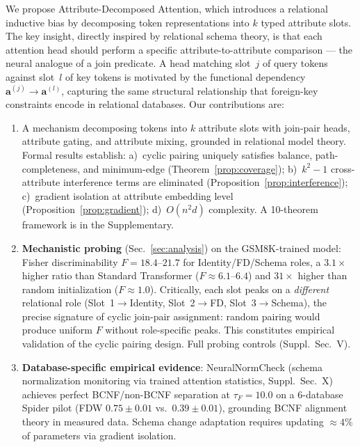 \documentclass[conference]{IEEEtran}
\begin{document}
We propose {Attribute-Decomposed Attention}, which introduces a relational inductive bias by decomposing token representations into $k$ typed attribute slots. The key insight, directly inspired by relational schema theory, is that each attention head should perform a specific attribute-to-attribute comparison --- the neural analogue of a join predicate. A head matching slot~$j$ of query tokens against slot~$l$ of key tokens is motivated by the functional dependency $\mathbf{a}^{(j)} \to \mathbf{a}^{(l)}$, capturing the same structural relationship that foreign-key constraints encode in relational databases.
Our contributions are:
\begin{enumerate}[noitemsep,topsep=2pt]
  \item A mechanism decomposing tokens into $k$ attribute slots with join-pair heads, attribute gating, and attribute mixing, grounded in relational model theory. Formal results establish: a)~cyclic pairing uniquely satisfies balance, path-completeness, and minimum-edge (Theorem~\ref{prop:coverage}); b)~$k^2{-}1$ cross-attribute interference terms are eliminated (Proposition~\ref{prop:interference}); c)~gradient isolation at attribute embedding level (Proposition~\ref{prop:gradient}); d)~$O(n^2d)$ complexity. A 10-theorem framework is in the Supplementary.

  \item \textbf{Mechanistic probing} (Sec.~\ref{sec:analysis}) on the GSM8K-trained model: Fisher discriminability $F{=}18.4$--$21.7$ for Identity/FD/Schema roles, a $3.1\times$ higher ratio than Standard Transformer ($F{\approx}6.1$--$6.4$) and $31\times$ higher than random initialization ($F{\approx}1.0$). Critically, each slot peaks on a \emph{different} relational role (Slot~1$\to$Identity, Slot~2$\to$FD, Slot~3$\to$Schema), the precise signature of cyclic join-pair assignment: random pairing would produce uniform $F$ without role-specific peaks. This constitutes empirical validation of the cyclic pairing design. Full probing controls (Suppl.\ Sec.~V).

  \item \textbf{Database-specific empirical evidence}: NeuralNormCheck (schema normalization monitoring via trained attention statistics, Suppl.\ Sec.~X) achieves perfect BCNF/non-BCNF separation at $\tau_F{=}10.0$ on a 6-database Spider pilot (FDW $0.75{\pm}0.01$ vs.\ $0.39{\pm}0.01$), grounding BCNF alignment theory in measured data. Schema change adaptation requires updating ${\approx}4\%$ of parameters via gradient isolation.


\end{enumerate}
\end{document}
